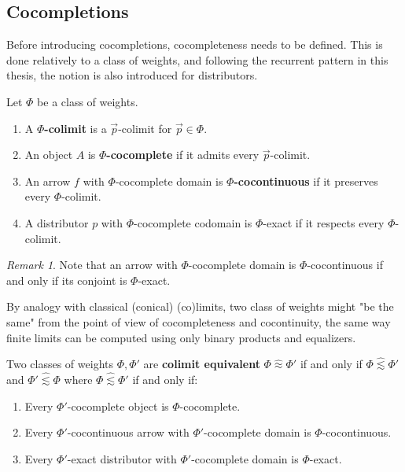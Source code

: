 \documentclass[10pt,a4paper]{article}
\newcommand{\colimeq}{\mathrel{\hat\approx}}
\newcommand{\colimleq}{\mathrel{\hat\lesssim}}
\theoremstyle{plain}
\theoremstyle{definition}
\theoremstyle{remark}
\newtheorem{remark}[theorem]{Remark}
\begin{document}
\subsection{Cocompletions}

Before introducing cocompletions, cocompleteness needs to be defined. This is done relatively to a class of weights, and following the recurrent pattern in this thesis, the notion is also introduced for distributors.

\begin{definition}
      
    Let $\Phi$ be a class of weights.
    \begin{enumerate}
        \item A \textbf{$\Phi$-colimit} is a $\vec p$-colimit for $\vec p\in\Phi$.
        \item An object $A$ is  \textbf{$\Phi$-cocomplete} if it admits every $\vec p$-colimit.
        \item An arrow $f$ with $\Phi$-cocomplete domain is \textbf{$\Phi$-cocontinuous} if it preserves every $\Phi$-colimit.
        \item A distributor $p$ with $\Phi$-cocomplete codomain is $\Phi$-exact if it respects every $\Phi$-colimit.
    \end{enumerate}
\end{definition}

\begin{remark}
    Note that an arrow with $\Phi$-cocomplete domain is $\Phi$-cocontinuous if and only if its conjoint is $\Phi$-exact.
\end{remark}

By analogy with classical (conical) (co)limits, two class of weights might "be the same" from the point of view of cocompleteness and cocontinuity, the same way finite limits can be computed using only binary products and equalizers.

\begin{definition}
    Two classes of weights $\Phi, \Phi'$ are \textbf{colimit equivalent} $\Phi \colimeq \Phi'$ if and only if $\Phi \colimleq \Phi'$ and $\Phi' \colimleq \Phi$ where $\Phi \colimleq \Phi'$ if and only if:
    \begin{enumerate}
        \item Every $\Phi'$-cocomplete object is $\Phi$-cocomplete.
        \item Every $\Phi'$-cocontinuous arrow with $\Phi'$-cocomplete domain is $\Phi$-cocontinuous.
        \item Every $\Phi'$-exact distributor with $\Phi'$-cocomplete domain is $\Phi$-exact.
    \end{enumerate}
\end{definition}
\end{document}
